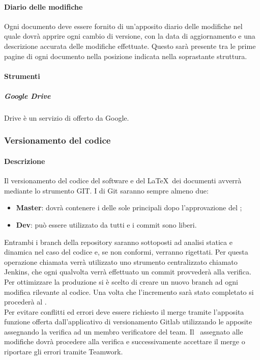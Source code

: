 \documentclass[../NormeDiProgetto_v3.0.0.tex]{subfiles}
\begin{document}
				\paragraph{Diario delle modifiche}
				Ogni documento deve essere fornito di un'apposito diario delle modifiche nel quale dovrà apprire ogni cambio di versione, con la data di aggiornamento e una descrizione accurata delle modifiche effettuate. Questo sarà presente tra le prime pagine di ogni documento nella posizione indicata nella soprastante struttura.

				\paragraph{Strumenti}
					\subparagraph{Google Drive}
					Drive è un servizio di  offerto da Google.


			\subsubsection{Versionamento del codice}
				\paragraph{Descrizione}
				Il versionamento del codice del software e del \LaTeX\ dei documenti avverrà mediante lo strumento GIT.
				I  di Git saranno sempre almeno due:
				\begin{itemize}
					\item \textbf{Master}: dovrà contenere i  delle sole  principali dopo l'approvazione del \responsabilediprogetto;
					\item \textbf{Dev}: può essere utilizzato da tutti e i commit sono liberi.
				\end{itemize}
				Entrambi i branch della repository saranno sottoposti ad analisi statica e dinamica nel caso del codice e, se non conformi, verranno rigettati.
				Per questa operazione chiamata  verrà utilizzato uno strumento centralizzato chiamato Jenkins, che ogni qualvolta verrà effettuato un commit provvederà alla verifica.
				Per ottimizzare la produzione si è scelto di creare un nuovo branch ad ogni modifica rilevante al codice. Una volta che l'incremento sarà stato completato si procederà al . \\
				Per evitare conflitti ed errori deve essere richiesto il merge tramite l'apposita funzione offerta dall'applicativo di versionamento Gitlab utilizzando le apposite  assegnando la verifica ad un membro verificatore del team. Il \verificatore\ assegnato alle modifiche dovrà procedere alla verifica e successivamente accettare il merge o riportare gli errori tramite Teamwork.
			
\end{document}

